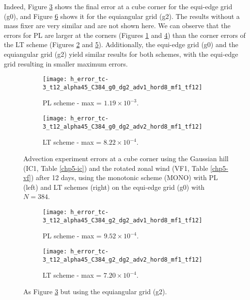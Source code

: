 \newpage
Indeed, Figure \ref{chp-advcs-sec-exp-adv2-errors-0} shows the final error at a cube corner for the equi-edge grid (g0), 
and Figure \ref{chp-advcs-sec-exp-adv2-errors-2} shows it for the equiangular grid (g2).
The results without a mass fixer are very similar and are not shown here. 
We can observe that the errors for PL are larger at the corners
(Figures \ref{chp-advcs-sec-exp-adv2-errors-0a} and \ref{chp-advcs-sec-exp-adv2-errors-2a}) 
than the corner errors of the LT scheme (Figures \ref{chp-advcs-sec-exp-adv2-errors-0b} and \ref{chp-advcs-sec-exp-adv2-errors-2b}).
Additionally, the equi-edge grid (g0) and the equiangular grid (g2) yield similar results for both schemes,
with the equi-edge grid resulting in smaller maximum errors.
\begin{figure}[!htb]
	\centering
	\begin{subfigure}{0.45\textwidth}
		\centering
		\texttt{[image: h\_error\_tc-3\_t12\_alpha45\_C384\_g0\_dg2\_adv1\_hord8\_mf1\_tf12]}
		\caption{PL scheme - max = $1.19 \times 10^{-3}$.\label{chp-advcs-sec-exp-adv2-errors-0a}}
	\end{subfigure}
	\begin{subfigure}{0.45\textwidth}
		\centering
		\texttt{[image: h\_error\_tc-3\_t12\_alpha45\_C384\_g0\_dg2\_adv2\_hord8\_mf1\_tf12]}
		\caption{LT scheme - max = $8.22 \times 10^{-4}$.\label{chp-advcs-sec-exp-adv2-errors-0b}}
	\end{subfigure}
	\caption{
		Advection experiment errors at a cube corner using the Gaussian hill (IC1, Table \ref{chp5-ic}) and  
		the rotated zonal wind (VF1, Table \ref{chp5-vf}) after 12 days, using the monotonic scheme (MONO) 
		with PL (left) and LT schemes (right) on the equi-edge grid (g0) with $N=384$. 
		\label{chp-advcs-sec-exp-adv2-errors-0}}
\end{figure}
\begin{figure}[!htb]
	\centering
	\begin{subfigure}{0.45\textwidth}
		\centering
		\texttt{[image: h\_error\_tc-3\_t12\_alpha45\_C384\_g2\_dg2\_adv1\_hord8\_mf1\_tf12]}
		\caption{PL scheme - max = $9.52 \times 10^{-4}$.\label{chp-advcs-sec-exp-adv2-errors-2a}}
	\end{subfigure}
	\begin{subfigure}{0.45\textwidth}
		\centering
		\texttt{[image: h\_error\_tc-3\_t12\_alpha45\_C384\_g2\_dg2\_adv2\_hord8\_mf1\_tf12]}
		\caption{LT scheme - max = $7.20 \times 10^{-4}$.\label{chp-advcs-sec-exp-adv2-errors-2b}}
	\end{subfigure}
	\caption{As Figure \ref{chp-advcs-sec-exp-adv2-errors-0} but using the equiangular grid (g2).\label{chp-advcs-sec-exp-adv2-errors-2}}
\end{figure}


